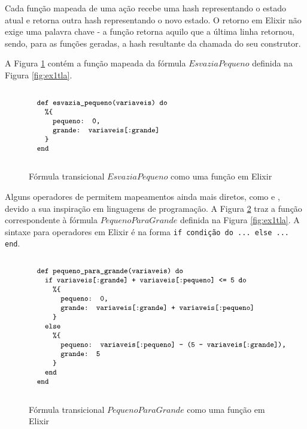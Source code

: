 Cada função mapeada de uma ação recebe uma hash representando o estado atual e retorna outra hash representando o novo estado. O retorno em Elixir não exige uma palavra chave - a função retorna aquilo que a última linha retornou, sendo, para as funções geradas, a hash resultante da chamada do seu construtor.

A Figura \ref{fig:esvaziapequeno-elixir} contém a função mapeada da fórmula $EsvaziaPequeno$ definida na Figura \ref{fig:ex1tla}.

\begin{figure}[h]
  \centering
  $\progfig{
  ~~def esvazia\_pequeno(variaveis) do\\
  ~~~~\%\{\\
  ~~~~~~pequeno: 0,\\
  ~~~~~~grande: variaveis[:grande]\\
  ~~~~\}\\
  ~~end
  }$
  \caption{Fórmula transicional $EsvaziaPequeno$ como uma função em Elixir}
\label{fig:esvaziapequeno-elixir}
\end{figure}

Alguns operadores de \TLA permitem mapeamentos ainda mais diretos, como \IF e \CASE, devido a sua inspiração em linguagens de programação. A Figura \ref{fig:pequenoparagrande-elixir} traz a função correspondente à fórmula $PequenoParaGrande$ definida na Figura \ref{fig:ex1tla}. A sintaxe para operadores \IF em Elixir é na forma \texttt{if condição do ... else ... end}.

\begin{figure}[h]
  \centering
  $\progfig{
  ~~def pequeno\_para\_grande(variaveis) do\\
  ~~~~if variaveis[:grande] + variaveis[:pequeno] <= 5 do\\
  ~~~~~~\%\{\\
  ~~~~~~~~pequeno: 0,\\
  ~~~~~~~~grande: variaveis[:grande] + variaveis[:pequeno]\\
  ~~~~~~\}\\
  ~~~~else\\
  ~~~~~~\%\{\\
  ~~~~~~~~pequeno: variaveis[:pequeno] - (5 - variaveis[:grande]),\\
  ~~~~~~~~grande: 5\\
  ~~~~~~\}\\
  ~~~~end\\
  ~~end
  }$
  \caption{Fórmula transicional $PequenoParaGrande$ como uma função em Elixir}
\label{fig:pequenoparagrande-elixir}
\end{figure}


